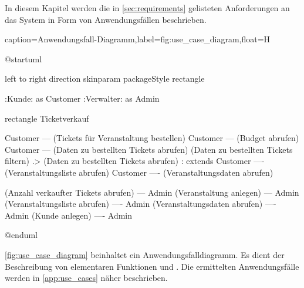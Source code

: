 In diesem Kapitel werden die in \autoref{sec:requirements} gelisteten Anforderungen an das System in Form von Anwendungsfällen beschrieben. 

\begin{dhbwfigure}{caption=Anwendungsfall-Diagramm,label=fig:use_case_diagram,float=H}
    \begin{plantuml}
        @startuml

            left to right direction
            skinparam packageStyle rectangle

            :Kunde: as Customer
            :Verwalter: as Admin

            rectangle Ticketverkauf {
                Customer --- (Tickets für Veranstaltung bestellen)
                Customer --- (Budget abrufen)
                Customer --- (Daten zu bestellten Tickets abrufen)
                (Daten zu bestellten Tickets filtern) .> (Daten zu bestellten Tickets abrufen) : extends
                Customer ---- (Veranstaltungsliste abrufen)
                Customer ---- (Veranstaltungsdaten abrufen)

                (Anzahl verkaufter Tickets abrufen) --- Admin
                (Veranstaltung anlegen) --- Admin
                (Veranstaltungsliste abrufen) ---- Admin
                (Veranstaltungsdaten abrufen) ---- Admin
                (Kunde anlegen) ---- Admin
            }

        @enduml
    \end{plantuml}
    \vspace{-7mm}
\end{dhbwfigure}\unskip

\autoref{fig:use_case_diagram} beinhaltet ein Anwendungsfalldiagramm.
Es dient der Beschreibung von elementaren Funktionen und .
Die ermittelten Anwendungsfälle werden in \autoref{app:use_cases} näher beschrieben.
